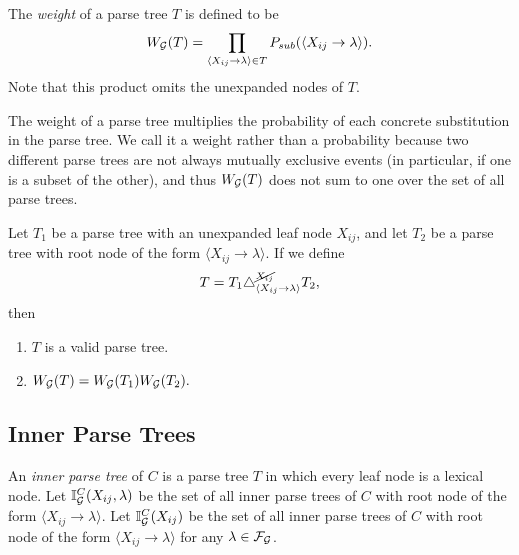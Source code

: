 \documentclass{article}
\newcommand\Inner{\mathbb{I}}
\begin{document}
\begin{defn}
The \emph{weight} of a parse tree $T$ is defined to be
$$ W_{{\mathcal G}}(T) = \prod_{\langle X_{ij} \to \lambda \rangle\in T} P_{sub}(
\langle X_{ij} \to \lambda \rangle).$$ Note that this product omits
the unexpanded nodes of $T$.
\end{defn}

The weight of a parse tree multiplies the probability of each concrete
substitution in the parse tree.  We call it a weight rather than a
probability because two different parse trees are not always mutually
exclusive events (in particular, if one is a subset of the other), and
thus $W_{{\mathcal G}}(T)$ does not sum to one over the set of all parse trees.

\begin{obs}
Let $T_1$ be a parse tree with an unexpanded leaf node $X_{ij}$, and let
$T_2$ be a parse tree with root node of the form $\langle X_{ij} \to
\lambda \rangle$. If we define
$$T = T_1 \triangle^{\cancel{X_{ij}}}_{\langle X_{ij} \to \lambda
  \rangle} T_2,$$
then
\begin{enumerate}
\item $T$ is a valid parse tree.
\item $W_{{\mathcal G}}(T) = W_{{\mathcal G}}(T_1) W_{{\mathcal G}}(T_2).$
\end{enumerate}
\end{obs}

\subsection{Inner Parse Trees}

\begin{defn}
  An \emph{inner parse tree} of $C$ is a parse tree $T$ in which every
  leaf node is a lexical node. Let $\Inner_\GGG^C(X_{ij}, \lambda)$ be
  the set of all inner parse trees of $C$ with root node of the form
  $\langle X_{ij} \to \lambda \rangle$. Let $\Inner_\GGG^C(X_{ij})$ be
  the set of all inner parse trees of $C$ with root node of the form
  $\langle X_{ij} \to \lambda \rangle$ for any $\lambda \in {\mathcal F}_{{\mathcal G}}$.
\end{defn}
\end{document}
